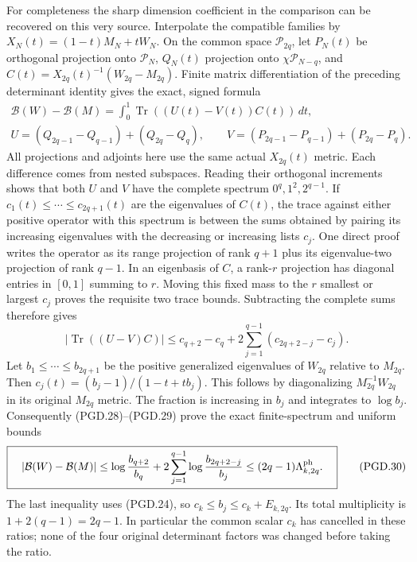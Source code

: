 For completeness the sharp dimension coefficient in the comparison
can be recovered on this very source. Interpolate the compatible
families by \(X_N(t)=(1-t)M_N+tW_N\). On the common space
\(\mathcal P_{2q}\), let \(P_N(t)\) be orthogonal projection onto
\(\mathcal P_N\), \(Q_N(t)\) projection onto
\(\chi\mathcal P_{N-q}\), and
\(C(t)=X_{2q}(t)^{-1}(W_{2q}-M_{2q})\).
Finite matrix differentiation of the preceding determinant identity
gives the exact, signed formula
\[
 \begin{gathered}
 \mathcal B(W)-\mathcal B(M)
       =\int_0^1\operatorname{Tr}((U(t)-V(t))C(t))\,dt,\\
 U=(Q_{2q-1}-Q_{q-1})+(Q_{2q}-Q_q),\qquad
 V=(P_{2q-1}-P_{q-1})+(P_{2q}-P_q).
 \end{gathered}
 \tag{PGD.28}\label{GraphV2:eq:pgd-exact-signed}
\]
All projections and adjoints here use the same actual \(X_{2q}(t)\)
metric. Each difference comes from nested subspaces. Reading their
orthogonal increments shows that both \(U\) and \(V\) have the
complete spectrum \(0^q,1^2,2^{q-1}\).
If \(c_1(t)\leq\cdots\leq c_{2q+1}(t)\) are the eigenvalues
of \(C(t)\), the trace against either positive operator with this
spectrum is between the sums obtained by pairing its increasing
eigenvalues with the decreasing or increasing lists \(c_j\).
One direct proof writes the operator as its range projection of rank
\(q+1\) plus its eigenvalue-two projection of rank \(q-1\).
In an eigenbasis of \(C\), a rank-\(r\) projection has diagonal
entries in \([0,1]\) summing to \(r\). Moving this fixed mass to
the \(r\) smallest or largest \(c_j\) proves the requisite two
trace bounds. Subtracting the complete sums therefore gives
\[
 |\operatorname{Tr}((U-V)C)|
 \leq c_{q+2}-c_q
       +2\sum_{j=1}^{q-1}(c_{2q+2-j}-c_j).
 \tag{PGD.29}\label{GraphV2:eq:pgd-spectral-bound}
\]
Let \(b_1\leq\cdots\leq b_{2q+1}\) be the positive generalized
eigenvalues of \(W_{2q}\) relative to \(M_{2q}\). Then
\(c_j(t)=(b_j-1)/(1-t+tb_j)\). This follows by diagonalizing
\(M_{2q}^{-1}W_{2q}\) in its original \(M_{2q}\) metric.
The fraction is increasing in \(b_j\) and integrates to
\(\log b_j\). Consequently (PGD.28)--(PGD.29) prove the exact
finite-spectrum and uniform bounds
\[
 \boxed{\quad
 |\mathcal B(W)-\mathcal B(M)|
 \leq\log\frac{b_{q+2}}{b_q}
      +2\sum_{j=1}^{q-1}\log\frac{b_{2q+2-j}}{b_j}
 \leq(2q-1)\Lambda_{k,2q}^{\rm ph}.
 \quad}
 \tag{PGD.30}\label{GraphV2:eq:pgd-signed-bound}
\]
The last inequality uses (PGD.24), so
\(c_k\leq b_j\leq c_k+E_{k,2q}\). Its total multiplicity is
\(1+2(q-1)=2q-1\). In particular the common scalar \(c_k\)
has cancelled in these ratios; none of the four original determinant
factors was changed before taking the ratio.


